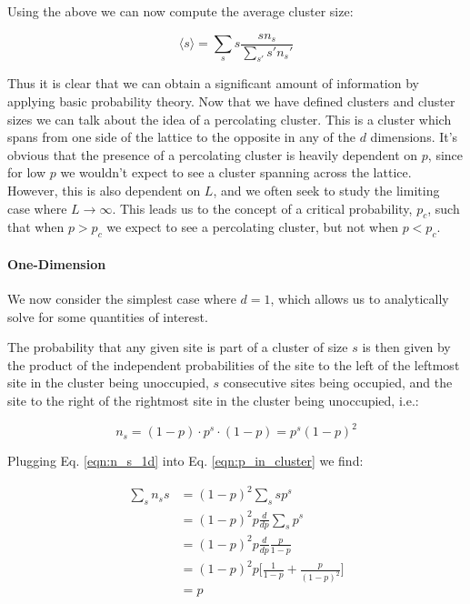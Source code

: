 Using the above we can now compute the average cluster size:

\begin{equation}
	\label{eqn:avg_cluster_size}
	\langle s \rangle = \sum_s s \frac{s n_s}{\sum_{s'} s' n_s'}
\end{equation}

Thus it is clear that we can obtain a significant amount of information by applying basic probability theory.
Now that we have defined clusters and cluster sizes we can talk about the idea of a percolating cluster.
This is a cluster which spans from one side of the lattice to the opposite in any of the $d$ dimensions.
It's obvious that the presence of a percolating cluster is heavily dependent on $p$, since for low $p$ we wouldn't expect to see a cluster spanning across the lattice.
However, this is also dependent on $L$, and we often seek to study the limiting case where $L \rightarrow \infty$.
This leads us to the concept of a critical probability, $p_c$, such that when $p > p_c$ we expect to see a percolating cluster, but not when $p < p_c$.

\paragraph{One-Dimension}
We now consider the simplest case where $d = 1$, which allows us to analytically solve for some quantities of interest.


The probability that any given site is part of a cluster of size $s$ is then given by the product of the independent probabilities of the site to the left of the leftmost site in the cluster being unoccupied, $s$ consecutive sites being occupied, and the site to the right of the rightmost site in the cluster being unoccupied, i.e.:

\begin{equation}
	\label{eqn:n_s_1d}
	n_s = (1 - p) \cdot p^s \cdot (1 - p) = p^s (1 - p)^2
\end{equation}

Plugging Eq. \ref{eqn:n_s_1d} into Eq. \ref{eqn:p_in_cluster} we find:

\begin{equation}
\begin{split}
	\sum_s n_s s &= (1 - p)^2 \sum_s s p^s\\
	&= (1 - p)^2 p \frac{d}{dp} \sum_s p^s\\
	&= (1 - p)^2 p \frac{d}{dp} \frac{p}{1-p}\\
	&= (1 - p)^2 p \bigg[ \frac{1}{1-p} + \frac{p}{(1 - p)^2} \bigg]\\
	&= p
\end{split}
\end{equation}

